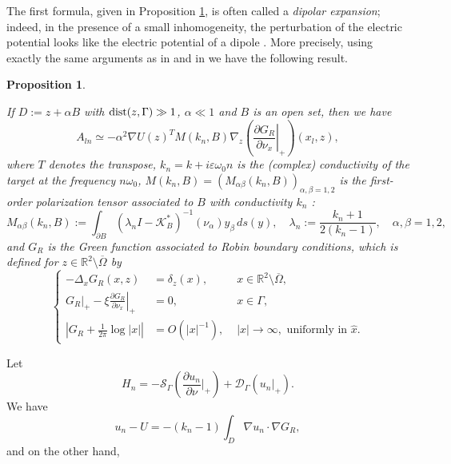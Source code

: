 \documentclass[final]{siamltex}
\numberwithin{equation}{section}
\numberwithin{figure}{section}
\numberwithin{table}{section}
\newtheorem{prop}{Proposition}
\begin{document}
The first formula, given in Proposition \ref{propos2}, is often
called a \emph{dipolar expansion}; indeed, in the presence of a
small inhomogeneity, the perturbation of the electric potential
looks like the electric potential of a dipole
\cite{ammari2004reconstruction, cedio1998identification}. More
precisely, using exactly the same arguments as in \cite[Chapter
4]{ammari2004reconstruction} and in \cite{ammarisima02} we have
the following result.

\begin{prop} \label{propos2}

If $D:=z+\alpha B$ with ${\rm dist}(z,\Gamma)\gg1$, $\alpha\ll1$
and $B$ is an open set, then we have
\begin{equation}
A_{ln}\simeq-\alpha^{2}\nabla U(z)^T M(k_{n},B)
\nabla_{z}\left(\left.\frac{\partial
G_{R}}{\partial\nu_{x}}\right|_{+}\right)(x_{l},z),\label{eq:SFR-first-approx}
\end{equation}
 where $T$ denotes the transpose, $k_{n}= k + i \varepsilon \omega_0 n$ is the (complex) conductivity of the
 target at the
frequency $n\omega_{0}$, $M(k_n,B) = (M_{\alpha
\beta}(k_n,B))_{\alpha, \beta=1,2}$ is the first-order
polarization tensor associated to $B$ with conductivity $k_n$
\cite{ammari2007polarization}:
$$
M_{\alpha \beta}(k_n,B):= \int_{\partial B} (\lambda_n I -
\mathcal{K}_{B}^{*})^{-1}(\nu_\alpha) y_\beta \, ds(y), \quad
\lambda_n:= \frac{k_n +1}{2(k_n -1)}, \quad \alpha, \beta=1,2,
$$
 and $G_{R}$ is the Green function
associated to Robin boundary conditions, which is defined for
$z\in \mathbb{R}^{2}\setminus\overline{\Omega}$ by
\begin{equation}
\left\{ \begin{alignedat}{2}-\Delta_{x}G_{R}(x,z) & =\delta_{z}(x), & \,\, x\in\mathbb{R}^{2}\setminus\overline{\Omega},\\
{}\left. G_{R} \right|_{+} -  \xi\left.\frac{\partial G_{R}}{\partial\nu_{x}}\right|_{+} & =0, & \,\, x\in\Gamma,\\
\left|G_{R} + \frac{1}{2\pi} \log |x| \right| & =
{O}(\left|x\right|^{-1}), &
\,\,\left|x\right|\rightarrow\infty,\text{ uniformly in }\hat{x}.
\end{alignedat}
\right.\label{eq:green-fonction-robin}
\end{equation}
\end{prop}
\proof Let
$$
H_n = - \mathcal{S}_\Gamma(\frac{\partial u_n}{\partial
\nu}\big|_+) + \mathcal{D}_\Gamma (u_n \big|_+).
$$
We have
$$
u_n - U = - (k_n -1) \int_D \nabla u_n \cdot \nabla G_R,
$$
and on the other hand,
\end{document}
